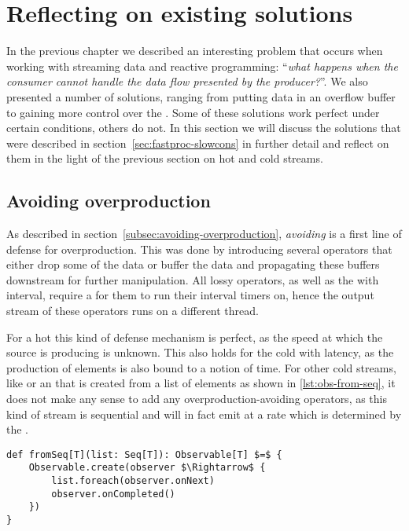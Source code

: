 \section{Reflecting on existing solutions}
In the previous chapter we described an interesting problem that occurs when working with streaming data and reactive programming: ``\textit{what happens when the consumer cannot handle the data flow presented by the producer?}''. We also presented a number of solutions, ranging from putting data in an overflow buffer to gaining more control over the \obs. Some of these solutions work perfect under certain conditions, others do not. In this section we will discuss the solutions that were described in section~\ref{sec:fastproc-slowcons} in further detail and reflect on them in the light of the previous section on hot and cold streams.

\subsection{Avoiding overproduction}
As described in section~\ref{subsec:avoiding-overproduction}, \textit{avoiding} is a first line of defense for overproduction. This was done by introducing several operators that either drop some of the data or buffer the data and propagating these buffers downstream for further manipulation. All lossy operators, as well as the  with interval, require a \sch for them to run their interval timers on, hence the output stream of these operators runs on a different thread.

For a hot \obs this kind of defense mechanism is perfect, as the speed at which the source is producing is unknown. This also holds for the cold \obs with latency, as the production of elements is also bound to a notion of time. For other cold streams, like  or an \obs that is created from a list of elements as shown in \autoref{lst:obs-from-seq}, it does not make any sense to add any overproduction-avoiding operators, as this kind of stream is sequential and will in fact emit at a rate which is determined by the \obv.

\begin{minipage}{\linewidth}
\begin{lstlisting}[style=ScalaStyle, caption={Observable from \code{Seq[T]}}, label={lst:obs-from-seq}]
def fromSeq[T](list: Seq[T]): Observable[T] $=$ {
    Observable.create(observer $\Rightarrow$ {
        list.foreach(observer.onNext)
        observer.onCompleted()
    })
}
\end{lstlisting}
\end{minipage}

